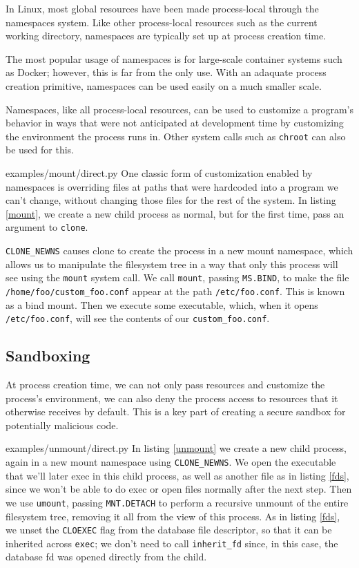 \documentclass[letterpaper,twocolumn,10pt]{article}
\begin{document}
In Linux, most global resources have been made process-local
through the namespaces system.
Like other process-local resources such as the current working directory,
namespaces are typically set up at process creation time.

The most popular usage of namespaces is for large-scale container systems such as Docker;
however, this is far from the only use.
With an adaquate process creation primitive,
namespaces can be used easily on a much smaller scale.

Namespaces, like all process-local resources,
can be used to customize a program's behavior
in ways that were not anticipated at development time
by customizing the environment the process runs in.
Other system calls such as \texttt{chroot} can also be used for this.


{examples/mount/direct.py}
One classic form of customization enabled by namespaces
is overriding files at paths that were hardcoded into a program we can't change,
without changing those files for the rest of the system.
In listing \ref{mount},
we create a new child process as normal,
but for the first time,
pass an argument to \texttt{clone}.

\verb|CLONE_NEWNS| causes clone to create the process in a new mount namespace,
which allows us to manipulate the filesystem tree in a way that only this process will see
using the \texttt{mount} system call.
We call \texttt{mount}, passing \texttt{MS.BIND}, to make the file \verb|/home/foo/custom_foo.conf|
appear at the path \verb|/etc/foo.conf|.
This is known as a bind mount.
Then we execute some executable,
which, when it opens \verb|/etc/foo.conf|, will see the contents of our \verb|custom_foo.conf|.
\subsection{Sandboxing}
At process creation time,
we can not only pass resources and customize the process's environment,
we can also deny the process access to resources that it otherwise receives by default.
This is a key part of creating a secure sandbox for potentially malicious code.


{examples/unmount/direct.py}
In listing \ref{unmount}
we create a new child process,
again in a new mount namespace using \verb|CLONE_NEWNS|.
We open the executable that we'll later exec in this child process,
as well as another file as in listing \ref{fds},
since we won't be able to do exec or open files normally after the next step.
Then we use \texttt{umount},
passing \texttt{MNT.DETACH} to perform a recursive unmount of the entire filesystem tree,
removing it all from the view of this process.
As in listing \ref{fds}, we unset the \texttt{CLOEXEC} flag from the database file descriptor,
so that it can be inherited across \texttt{exec};
we don't need to call \verb|inherit_fd| since, in this case, the database fd was opened directly from the child.
\end{document}
